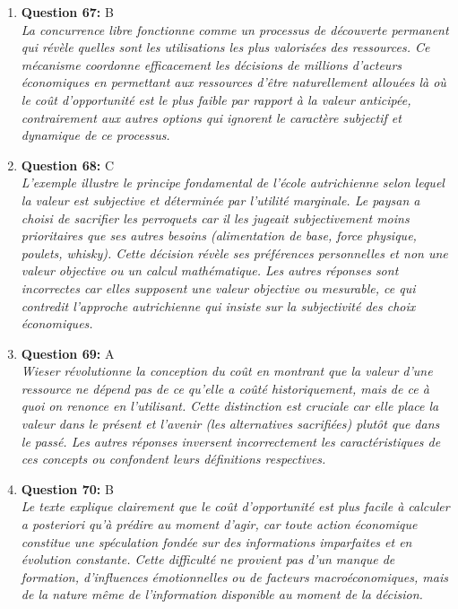 \documentclass[12pt,a4paper]{article}
\begin{document}
\begin{enumerate}
\item \textbf{Question 67:} B
\\ \textit{La concurrence libre fonctionne comme un processus de découverte permanent qui révèle quelles sont les utilisations les plus valorisées des ressources. Ce mécanisme coordonne efficacement les décisions de millions d'acteurs économiques en permettant aux ressources d'être naturellement allouées là où le coût d'opportunité est le plus faible par rapport à la valeur anticipée, contrairement aux autres options qui ignorent le caractère subjectif et dynamique de ce processus.}

\item \textbf{Question 68:} C
\\ \textit{L'exemple illustre le principe fondamental de l'école autrichienne selon lequel la valeur est subjective et déterminée par l'utilité marginale. Le paysan a choisi de sacrifier les perroquets car il les jugeait subjectivement moins prioritaires que ses autres besoins (alimentation de base, force physique, poulets, whisky). Cette décision révèle ses préférences personnelles et non une valeur objective ou un calcul mathématique. Les autres réponses sont incorrectes car elles supposent une valeur objective ou mesurable, ce qui contredit l'approche autrichienne qui insiste sur la subjectivité des choix économiques.}

\item \textbf{Question 69:} A
\\ \textit{Wieser révolutionne la conception du coût en montrant que la valeur d'une ressource ne dépend pas de ce qu'elle a coûté historiquement, mais de ce à quoi on renonce en l'utilisant. Cette distinction est cruciale car elle place la valeur dans le présent et l'avenir (les alternatives sacrifiées) plutôt que dans le passé. Les autres réponses inversent incorrectement les caractéristiques de ces concepts ou confondent leurs définitions respectives.}

\item \textbf{Question 70:} B
\\ \textit{Le texte explique clairement que le coût d'opportunité est plus facile à calculer a posteriori qu'à prédire au moment d'agir, car toute action économique constitue une spéculation fondée sur des informations imparfaites et en évolution constante. Cette difficulté ne provient pas d'un manque de formation, d'influences émotionnelles ou de facteurs macroéconomiques, mais de la nature même de l'information disponible au moment de la décision.}


\end{enumerate}
\end{document}
